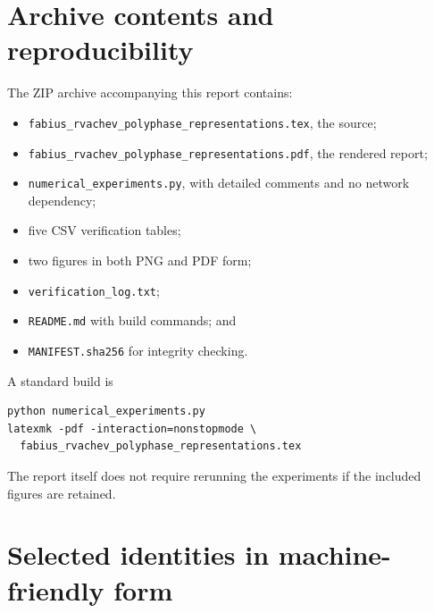 \documentclass[11pt,oneside]{article}
\numberwithin{equation}{section}
\theoremstyle{definition}
\theoremstyle{remark}
\begin{document}
\section{Archive contents and reproducibility}
\label{app:archive}

The ZIP archive accompanying this report contains:
\begin{itemize}
\item \texttt{fabius\_rvachev\_polyphase\_representations.tex}, the source;
\item \texttt{fabius\_rvachev\_polyphase\_representations.pdf}, the rendered report;
\item \texttt{numerical\_experiments.py}, with detailed comments and no network dependency;
\item five CSV verification tables;
\item two figures in both PNG and PDF form;
\item \texttt{verification\_log.txt};
\item \texttt{README.md} with build commands; and
\item \texttt{MANIFEST.sha256} for integrity checking.
\end{itemize}

A standard build is
\begin{lstlisting}[style=python]
python numerical_experiments.py
latexmk -pdf -interaction=nonstopmode \
  fabius_rvachev_polyphase_representations.tex
\end{lstlisting}
The report itself does not require rerunning the experiments if the included
figures are retained.

\section{Selected identities in machine-friendly form}
\label{app:machine-identities}
\end{document}
